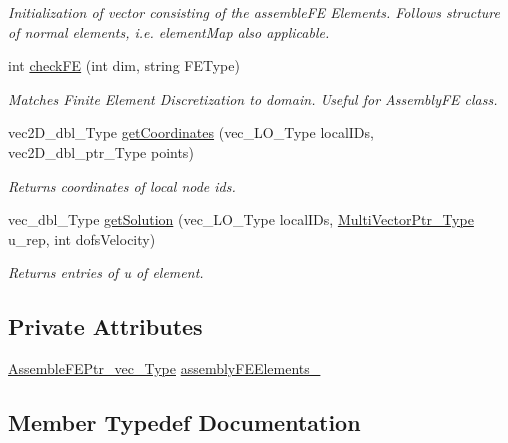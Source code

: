 \begin{DoxyCompactItemize}
\begin{DoxyCompactList}\small\item\em Initialization of vector consisting of the assemble\+FE Elements. Follows structure of \textquotesingle{}normal\textquotesingle{} elements, i.\+e. element\+Map also applicable. \end{DoxyCompactList}\item 
int \hyperlink{classFEDD_1_1FE__Test_afe37563f768c20036dd87277258b8019}{check\+FE} (int dim, string F\+E\+Type)
\begin{DoxyCompactList}\small\item\em Matches Finite Element Discretization to domain. Useful for Assembly\+FE class. \end{DoxyCompactList}\item 
vec2\+D\+\_\+dbl\+\_\+\+Type \hyperlink{classFEDD_1_1FE__Test_a60f1f1b498d11e9953349cd1ba532527}{get\+Coordinates} (vec\+\_\+\+L\+O\+\_\+\+Type local\+I\+Ds, vec2\+D\+\_\+dbl\+\_\+ptr\+\_\+\+Type points)
\begin{DoxyCompactList}\small\item\em Returns coordinates of local node ids. \end{DoxyCompactList}\item 
vec\+\_\+dbl\+\_\+\+Type \hyperlink{classFEDD_1_1FE__Test_af91b8a8834bd9e3a8e7f2893e353a212}{get\+Solution} (vec\+\_\+\+L\+O\+\_\+\+Type local\+I\+Ds, \hyperlink{classFEDD_1_1FE__Test_ac7c0363aa74e0bfcb903c13330c50185}{Multi\+Vector\+Ptr\+\_\+\+Type} u\+\_\+rep, int dofs\+Velocity)
\begin{DoxyCompactList}\small\item\em Returns entries of u of element. \end{DoxyCompactList}\end{DoxyCompactItemize}
\subsection*{Private Attributes}
\begin{DoxyCompactItemize}
\item 
\hyperlink{classFEDD_1_1FE__Test_a7c6207bb2e578ea92dbfb20aa766e2d3}{Assemble\+F\+E\+Ptr\+\_\+vec\+\_\+\+Type} \hyperlink{classFEDD_1_1FE__Test_a8456e72f910449b1eea6883291d2cda0}{assembly\+F\+E\+Elements\+\_\+}
\end{DoxyCompactItemize}


\subsection{Member Typedef Documentation}
\mbox{\label{classFEDD_1_1FE__Test_afbc20c921480ce9f89ec045f94f6806a}} 
